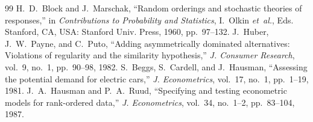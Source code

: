 \documentclass[11pt,journal,a4paper]{IEEEtran}
\begin{document}
\begin{thebibliography}{99}
 H.~D.~Block and J.~Marschak, ``Random orderings and stochastic theories of responses,'' in
  \emph{Contributions to Probability and Statistics}, I.~Olkin \emph{et~al.}, Eds. Stanford, CA, USA:
  Stanford Univ. Press, 1960, pp.~97--132.
 J.~Huber, J.~W.~Payne, and C.~Puto, ``Adding asymmetrically dominated alternatives: Violations
  of regularity and the similarity hypothesis,'' \emph{J. Consumer Research}, vol.~9, no.~1, pp.~90--98, 1982.
 S.~Beggs, S.~Cardell, and J.~Hausman, ``Assessing the potential demand for electric cars,''
  \emph{J. Econometrics}, vol.~17, no.~1, pp.~1--19, 1981.
 J.~A.~Hausman and P.~A.~Ruud, ``Specifying and testing econometric models for rank-ordered
  data,'' \emph{J. Econometrics}, vol.~34, no.~1--2, pp.~83--104, 1987.
\end{thebibliography}
\end{document}
